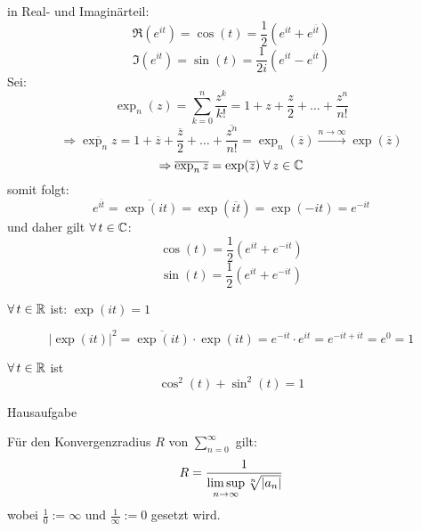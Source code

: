 \documentclass[../ana1u.tex]{subfiles}
\begin{document}
in Real- und Imaginärteil:
\[\Re(e^{it}) = \cos(t) = \frac{1}{2} (e^{it} + e^{\overline{it}}) \]
\[\Im(e^{it}) = \sin(t) = \frac{1}{2i} (e^{it} - e^{\overline{it}}) \]
Sei:
\[\exp_n(z) = \sum_{k=0}^{n} \frac{z^k}{k!} = 1 + z + \frac{z}{2} + \dots + \frac{z^n}{n!} \]
\[\Rightarrow \overline{\exp_n{z}} 
= 1 + \overline{z} + \frac{\overline{z}}{2} + \dots + \frac{\overline{z^n}}{n!} 
= \exp_n(\overline{z}) \overset{n \rightarrow \infty}{\rightarrow} \exp(\overline{z}) \]
\[\Rightarrow \overline{\exp_n{z}} = \exp(\overline{z}) \; \forall \, z \in \mathbb{C} \]
somit folgt:
\[e^{\overline{it}} = \overline{\exp(it)} = \exp(\overline{it}) = \exp(-it) = e^{-it} \]
und daher gilt \(\forall \, t \in \mathbb{C} \):
\[\cos(t) = \frac{1}{2} (e^{it} + e^{-it}) \]
\[\sin(t) = \frac{1}{2} (e^{it} + e^{-it}) \]
\begin{satz}
	\(\forall \, t \in \mathbb{R} \) ist: \(\exp(it) = 1 \)
\end{satz}
\begin{bew}
	\[|\exp(it)|^2 = \overline{\exp(it)} \cdot \exp(it) = e^{-it} \cdot e^{it} 
	= e^{-it + it} = e^0 = 1 \]
\end{bew}
\begin{kor}
	\(\forall \, t \in \mathbb{R} \) ist 
	\[\cos^2(t) + \sin^2(t) = 1 \]
\end{kor}
\begin{bew}
	Hausaufgabe
\end{bew}
\begin{lem}
	Für den Konvergenzradius \(R \) von \(\sum_{n=0}^{\infty} \) gilt:
	\[R = \frac{1}{\limsup\limits_{n\rightarrow\infty}\sqrt[n]{|a_n|}} \]
	wobei \(\frac{1}{0} := \infty \) und \(\frac{1}{\infty} := 0 \) gesetzt wird.
\end{lem}
\end{document}
